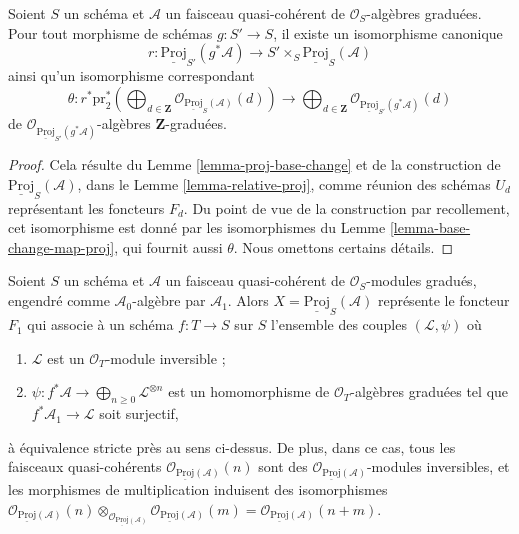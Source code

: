 \begin{lemma}
\label{lemma-relative-proj-base-change}
Soient $S$ un schéma et $\mathcal{A}$ un faisceau quasi-cohérent de
$\mathcal{O}_S$-algèbres graduées. Pour tout morphisme de schémas
$g : S' \to S$, il existe un isomorphisme canonique
$$
r :
\underline{\text{Proj}}_{S'}(g^*\mathcal{A})
\longrightarrow
S' \times_S \underline{\text{Proj}}_S(\mathcal{A})
$$
ainsi qu'un isomorphisme correspondant
$$
\theta :
r^*\text{pr}_2^*\left(\bigoplus\nolimits_{d \in \mathbf{Z}}
\mathcal{O}_{\underline{\text{Proj}}_S(\mathcal{A})}(d)\right)
\longrightarrow
\bigoplus\nolimits_{d \in \mathbf{Z}}
\mathcal{O}_{\underline{\text{Proj}}_{S'}(g^*\mathcal{A})}(d)
$$
de $\mathcal{O}_{\underline{\text{Proj}}_{S'}(g^*\mathcal{A})}$-algèbres
$\mathbf{Z}$-graduées.
\end{lemma}

\begin{proof}
Cela résulte du Lemme \ref{lemma-proj-base-change} et de la construction
de $\underline{\text{Proj}}_S(\mathcal{A})$, dans le
Lemme \ref{lemma-relative-proj}, comme réunion des schémas $U_d$ représentant
les foncteurs $F_d$. Du point de vue de la construction par recollement,
cet isomorphisme est donné par les isomorphismes du
Lemme \ref{lemma-base-change-map-proj}, qui fournit aussi $\theta$.
Nous omettons certains détails.
\end{proof}

\begin{lemma}
\label{lemma-apply-relative}
Soient $S$ un schéma et $\mathcal{A}$ un faisceau quasi-cohérent de
$\mathcal{O}_S$-modules gradués, engendré comme $\mathcal{A}_0$-algèbre par
$\mathcal{A}_1$. Alors $X = \underline{\text{Proj}}_S(\mathcal{A})$
représente le foncteur $F_1$ qui associe à un schéma $f : T \to S$ sur $S$
l'ensemble des couples $(\mathcal{L}, \psi)$ où
\begin{enumerate}
\item $\mathcal{L}$ est un $\mathcal{O}_T$-module inversible ;
\item $\psi : f^*\mathcal{A} \to \bigoplus_{n \geq 0} \mathcal{L}^{\otimes n}$
est un homomorphisme de $\mathcal{O}_T$-algèbres graduées tel que
$f^*\mathcal{A}_1 \to \mathcal{L}$ soit surjectif,
\end{enumerate}
à équivalence stricte près au sens ci-dessus. De plus, dans ce cas, tous les
faisceaux quasi-cohérents
$\mathcal{O}_{\underline{\text{Proj}}(\mathcal{A})}(n)$ sont des
$\mathcal{O}_{\underline{\text{Proj}}(\mathcal{A})}$-modules inversibles,
et les morphismes de multiplication induisent des isomorphismes
$
\mathcal{O}_{\underline{\text{Proj}}(\mathcal{A})}(n)
\otimes_{\mathcal{O}_{\underline{\text{Proj}}(\mathcal{A})}}
\mathcal{O}_{\underline{\text{Proj}}(\mathcal{A})}(m) =
\mathcal{O}_{\underline{\text{Proj}}(\mathcal{A})}(n + m)$.
\end{lemma}

